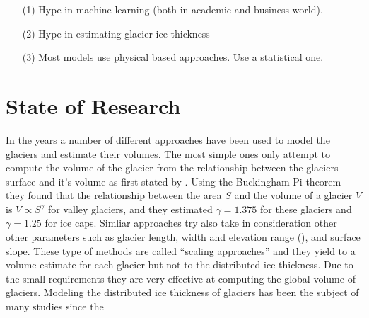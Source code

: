 \begin{itemize}
	\item[(1)] Hype in machine learning (both in academic and business world).
	\item[(2)] Hype in estimating glacier ice thickness
	\item[(3)] Most models use physical based approaches. Use a statistical one.
\end{itemize}
 


\section{State of Research}\label{research}
In the years a number of different approaches have been used to model the glaciers and estimate their volumes.
The most simple ones only attempt to compute the volume of the glacier from the relationship between the glaciers surface and it's volume as first stated by \citet{bahr1997}. Using the Buckingham Pi
theorem they found that the relationship between the area $S$ and the volume of a glacier $V$ is $V \propto S^{\gamma}$ for valley glaciers, and they estimated $\gamma=1.375$ for these glaciers and $\gamma=1.25$ for ice caps. Simliar approaches try also take in consideration other other parameters such as glacier length, width and elevation range (\cite{Grinsted2013}), and surface slope. These type of methods are called ``scaling approaches'' and they yield to a volume estimate for each glacier but not to the distributed ice thickness. Due to the small requirements they are very effective at computing the global volume of glaciers.
Modeling the distributed ice thickness of glaciers has been the subject of many studies since the 

